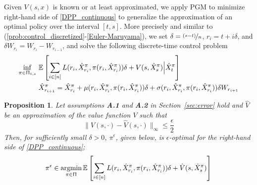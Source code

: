 \documentclass{article}
\newtheorem{proposition}{Proposition}[section]
\numberwithin{equation}{section}
\begin{document}
    Given $V(s,x)$ is known  or at least approximated, we apply PGM to minimize right-hand side of \eqref{DPP_continuous} to generalize the approximation of an optimal policy over the interval $[t,s]$. More precisely and similar to  (\ref{prob:control_discretized}-\ref{Euler-Maruyama}), we set  $\delta=\nicefrac{(s-t)}{n}$, $r_i=t+i\delta$, and $\delta W_{{r_{i}}}=W_{{r_{i}}}-W_{{r_{i-1}}}$, and solve the following discrete-time control problem
 \begin{equation}
 \begin{split}\label{prob:risk_minimization_theta_t_s}
    \inf_{\pi\in\Uppi_{t,s}}~ &\mathbb{E}\left[\sum_{i\in[n]}L(r_{i},\hat{X}^\pi_{r_{i}},\pi(r_{i},\hat{X}^\pi_{r_{i}}))\delta + V(s,\hat{X}_s^\pi)\Big| \hat{X}^\pi_{t} \right] \\
   &\hat{X}^\pi_{r_{i+1}} =\hat{X}^\pi_{r_{i}}+\mu({r_{i}},\hat{X}_{r_{i}}^\pi,\pi(r_{i},\hat{X}^\pi_{r_{i}}))\delta+\sigma({r_{i}},\hat{X}_{r_{i}}^\pi,\pi(r_{i},\hat{X}^\pi_{r_{i}}))\delta W_{{r_{i+1}}}
\end{split}
\end{equation}
\begin{proposition}
Let assumptions \textbf{A.1} and \textbf{A.2} in Section~\ref{sec:error} hold and  $\hat{V}$ be an approximation of the value function $V$ such that 
\begin{equation}
    \|V(s,\cdot)-\hat{V}(s,\cdot)\|_\infty\le \dfrac{\epsilon}{2}
\end{equation}
Then, for sufficiently small $\delta>0$,  $\pi^\epsilon$, given below, is $\epsilon$-optimal for the right-hand side of \eqref{DPP_continuous};
\begin{equation}
    \pi^\epsilon \in\mathop{\text{\normalfont argmin}}_{\pi\in\Uppi}\mathbb{E}\left[\sum_{i\in[n]}L(r_{i},\hat{X}^\pi_{r_{i}},\pi(r_{i},\hat{X}^\pi_{r_{i}}))\delta + \hat{V}(s,\hat{X}_s^\pi)\right]
\end{equation}
\end{proposition}
 

\end{document}
